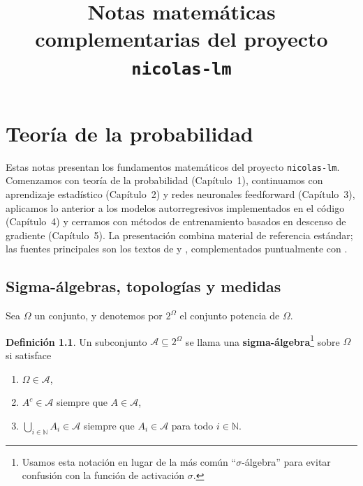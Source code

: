 \documentclass[11pt]{report}
\title{Notas matemáticas complementarias del proyecto \texttt{nicolas-lm}}
\date{}
\newenvironment{tcolorbox}[1][]{\par\medskip\noindent\ignorespaces}{\par\medskip}
\theoremstyle{definition}
\newtheorem{definicion}{Definición}[section]
\theoremstyle{plain}
\numberwithin{equation}{section}
\begin{document}
\maketitle
\tableofcontents



\chapter{Teoría de la probabilidad}

Estas notas presentan los fundamentos matemáticos del proyecto \texttt{nicolas-lm}. Comenzamos con teoría de la probabilidad (Capítulo~1), continuamos con aprendizaje estadístico (Capítulo~2) y redes neuronales feedforward (Capítulo~3), aplicamos lo anterior a los modelos autorregresivos implementados en el código (Capítulo~4) y cerramos con métodos de entrenamiento basados en descenso de gradiente (Capítulo~5). La presentación combina material de referencia estándar; las fuentes principales son los textos de \citet{petersen-zech-2026} y \citet{calin-2020}, complementados puntualmente con \citet{wegner-2024}. 


\section{Sigma-álgebras, topologías y medidas}

Sea \(\Omega\) un conjunto, y denotemos por \(2^\Omega\) el conjunto potencia de \(\Omega\).

\begin{tcolorbox}[colback=blue!8, colframe=blue!8, boxrule=0pt]
\begin{definicion}
Un subconjunto \(\mathcal{A}\subseteq 2^\Omega\) se llama una \textbf{sigma-álgebra}\footnote{Usamos esta notación en lugar de la más común ``\(\sigma\)-álgebra'' para evitar confusión con la función de activación \(\sigma\).} sobre \(\Omega\) si satisface

\begin{enumerate}
    \item[(i)] \(\Omega\in\mathcal{A}\),
    \item[(ii)] \(A^c\in\mathcal{A}\) siempre que \(A\in\mathcal{A}\),
    \item[(iii)] \(\bigcup_{i\in\mathbb{N}} A_i\in\mathcal{A}\) siempre que \(A_i\in\mathcal{A}\) para todo \(i\in\mathbb{N}\).
\end{enumerate}
\end{definicion}
\end{tcolorbox}
\end{document}
